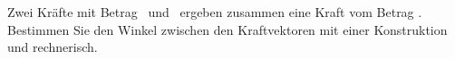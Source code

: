 Zwei Kräfte mit Betrag \FEaO\ und \FEbO\ ergeben zusammen eine Kraft vom Betrag \FRkO. Bestimmen Sie den Winkel zwischen den Kraftvektoren mit einer Konstruktion und rechnerisch.
